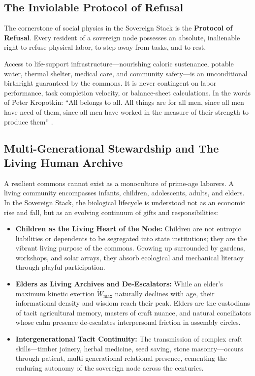 \subsection{The Inviolable Protocol of Refusal}
The cornerstone of social physics in the Sovereign Stack is the \textbf{Protocol of Refusal}. Every resident of a sovereign node possesses an absolute, inalienable right to refuse physical labor, to step away from tasks, and to rest.

Access to life-support infrastructure---nourishing caloric sustenance, potable water, thermal shelter, medical care, and community safety---is an unconditional birthright guaranteed by the commons. It is never contingent on labor performance, task completion velocity, or balance-sheet calculations. In the words of Peter Kropotkin: ``All belongs to all. All things are for all men, since all men have need of them, since all men have worked in the measure of their strength to produce them'' \cite{kropotkin1902}.

\subsection{Multi-Generational Stewardship and The Living Human Archive}
A resilient commons cannot exist as a monoculture of prime-age laborers. A living community encompasses infants, children, adolescents, adults, and elders. In the Sovereign Stack, the biological lifecycle is understood not as an economic rise and fall, but as an evolving continuum of gifts and responsibilities:
\begin{itemize}
    \item \textbf{Children as the Living Heart of the Node:} Children are not entropic liabilities or dependents to be segregated into state institutions; they are the vibrant living purpose of the commons. Growing up surrounded by gardens, workshops, and solar arrays, they absorb ecological and mechanical literacy through playful participation.
    \item \textbf{Elders as Living Archives and De-Escalators:} While an elder's maximum kinetic exertion $\dot{W}_{\max}$ naturally declines with age, their informational density and wisdom reach their peak. Elders are the custodians of tacit agricultural memory, masters of craft nuance, and natural conciliators whose calm presence de-escalates interpersonal friction in assembly circles.
    \item \textbf{Intergenerational Tacit Continuity:} The transmission of complex craft skills---timber joinery, herbal medicine, seed saving, stone masonry---occurs through patient, multi-generational relational presence, cementing the enduring autonomy of the sovereign node across the centuries.
\end{itemize}


